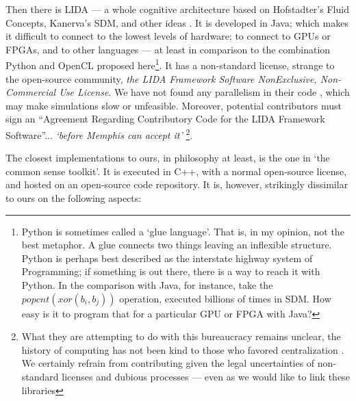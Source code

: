 \documentclass[preprint,12pt, a4paper]{elsarticle}
\begin{document}
Then there is LIDA --- a whole cognitive architecture based on Hofstadter's Fluid Concepts, Kanerva's SDM, and other ideas \citep{Anwar2003, snaider_integer_2013, snaider_modular_2014, franklin_lida:_2014}.  It is developed in Java; which makes it difficult to connect to the lowest levels of hardware; to connect to GPUs or FPGAs, and to other languages --- at least in comparison to the combination Python and OpenCL proposed here\footnote{Python is sometimes called a `glue language'. That is, in my opinion, not the best metaphor.  A glue connects two things leaving an inflexible structure.  Python is perhaps best described as the interstate highway system of Programming; if something is out there, there is a way to reach it with Python.  In the comparison with Java, for instance, take the $popcnt(xor(b_i,b_j))$ operation, executed billions of times in SDM. How easy is it to program that for a particular GPU or FPGA with Java?}.  It has a non-standard license, strange to the open-source community, \emph{the LIDA Framework Software NonExclusive, Non-Commercial Use License}.  We have not found any parallelism in their code \citep{ccrg_ccrg_nodate}, which may make simulations slow or unfeasible. Moreover, potential contributors must sign an ``Agreement Regarding Contributory Code for the LIDA Framework Software''... \emph{`before Memphis can accept it'} \footnote{What they are attempting to do with this bureaucracy remains unclear, the history of computing has not been kind to those who favored centralization \citep{ferguson_computer_2002}.  We certainly refrain from contributing given the legal uncertainties of non-standard licenses and dubious processes --- even as we would like to link these libraries}.

The closest implementations to ours, in philosophy at least, is the one in `the common sense toolkit'. It is executed in C++, with a normal open-source license, and hosted on an open-source code repository.  It is, however, strikingly dissimilar to ours on the following aspects:
\end{document}
